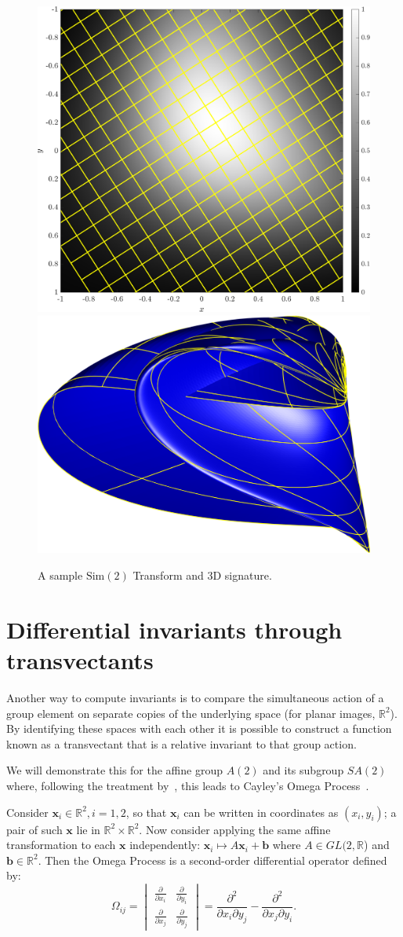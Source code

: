 \documentclass{artjlt}
\begin{document}
\begin{figure}
\centering
\includegraphics[width=.45\textwidth]{Figs/f_transformed_Sim2.png}
\includegraphics[width=.45\textwidth]{Figs/Sim2_signature.png}
\caption{A sample $\text{Sim}(2)$ Transform and 3D signature.}
\label{fig:Sim2}
\end{figure}

\section{Differential invariants through transvectants}

Another way to compute invariants is to compare the simultaneous action of a group element on separate copies of the underlying space (for planar images, $\mathbb{R}^2$). By identifying these spaces with each other it is possible to construct a function known as a transvectant that is a relative invariant to that group action.

We will demonstrate this for the affine group $A(2)$ and its subgroup
$SA(2)$ where, following the treatment by~\citet{OlverCIT}, this leads to
Cayley's Omega Process~\citep{Cayley1846}. 

Consider $\mathbf{x}_i \in \mathbb{R}^2, i=1,2$, so that $\mathbf{x}_i$ can
be written in coordinates as $(x_i, y_i)$; a pair of such $\mathbf{x}$ lie in $\mathbb{R}^2 \times \mathbb{R}^2$. Now consider applying the same affine transformation to each $\mathbf{x}$ independently: $\mathbf{x}_i \mapsto A \mathbf{x}_i + \mathbf{b}$ where $A \in GL(2,\mathbb{R}$) and $\mathbf{b} \in \mathbb{R}^2$. Then the Omega Process is a second-order differential operator defined by: 
\begin{equation}
\Omega_{ij} = \begin{vmatrix} \frac{\partial}{\partial x_i} &
\frac{\partial}{\partial y_i} \\ \frac{\partial}{\partial x_j} &
\frac{\partial}{\partial y_j} \end{vmatrix} = 
\frac{\partial^2}{\partial x_i
\partial y_j} - \frac{\partial^2}{\partial x_j \partial y_i}.
\end{equation}
\end{document}
